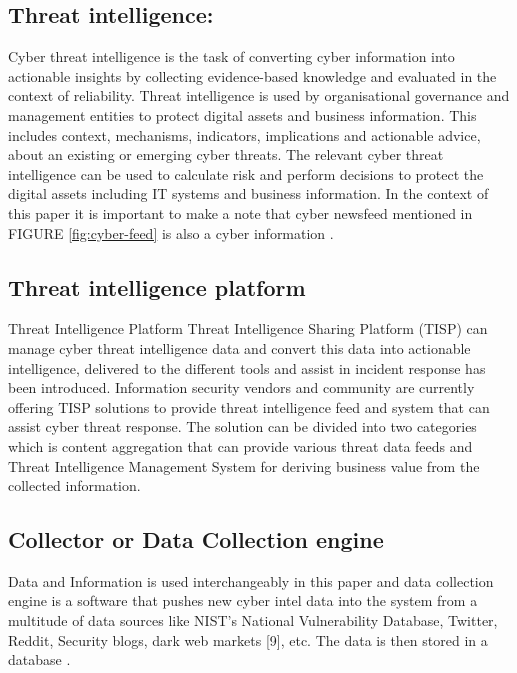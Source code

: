 \subsection{Threat intelligence:}	

Cyber threat intelligence is the task of 
converting cyber information 
into actionable insights 
by collecting evidence-based knowledge 
and evaluated in the context of reliability. 
Threat intelligence is used by organisational governance 
and management entities 
to protect digital assets 
and business information. 
This includes context, mechanisms, indicators, implications 
and actionable advice, 
about an existing or emerging cyber threats. 
The relevant cyber threat intelligence 
can be used to calculate risk 
and perform decisions to protect the digital assets including IT systems and business information. 
In the context of this paper 
it is important to make a note 
that cyber newsfeed mentioned in 
FIGURE \ref{fig:cyber-feed} 
is also a cyber information 
\citep{mavroeidis2017cyber}.



\subsection{Threat intelligence  platform}	

Threat Intelligence  Platform  
 Threat Intelligence Sharing Platform (TISP) can manage cyber threat intelligence data and convert this data into actionable intelligence, delivered to the different tools and assist in incident response has been introduced. Information security vendors and community are currently offering TISP solutions to provide threat intelligence feed and system that can assist cyber threat response. The solution can be divided into two categories which is content aggregation that can provide various threat data feeds and Threat Intelligence Management System for deriving business value from the collected information.
\citep{abu2018cyber}
\subsection{Collector or Data Collection engine}	



Data and Information 
is used interchangeably 
in this paper and data collection engine is a software that pushes new cyber intel  data into the system from a multitude of data sources like NIST’s National Vulnerability Database, Twitter, Reddit, Security blogs, dark web markets [9], etc.  The data is then stored in a database \citep{mittal2019cyber}.

